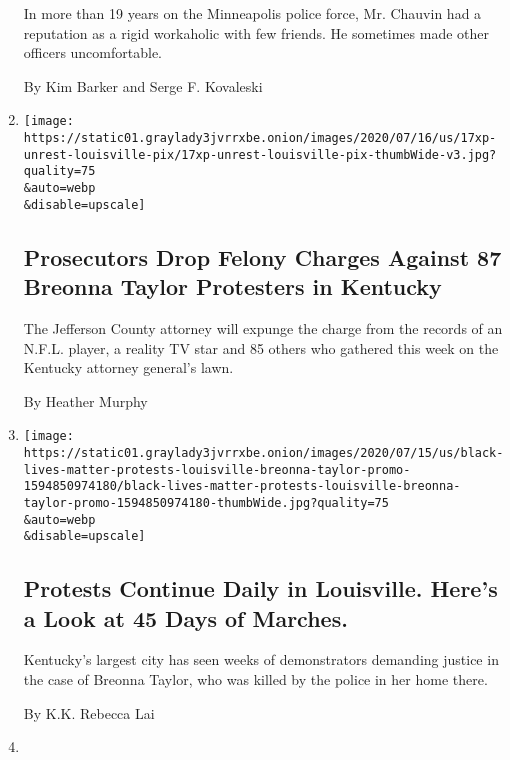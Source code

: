 \begin{enumerate}
  In more than 19 years on the Minneapolis police force, Mr. Chauvin had
  a reputation as a rigid workaholic with few friends. He sometimes made
  other officers uncomfortable.

  By Kim Barker and Serge F. Kovaleski
\item
  \href{/2020/07/17/us/breonna-taylor-louisville-protests.html}{}

  \texttt{[image: https://static01.graylady3jvrrxbe.onion/images/2020/07/16/us/17xp-unrest-louisville-pix/17xp-unrest-louisville-pix-thumbWide-v3.jpg?quality=75\\\&auto=webp\\\&disable=upscale]}

  \hypertarget{prosecutors-drop-felony-charges-against-87-breonna-taylor-protesters-in-kentucky}{%
  \subsection{Prosecutors Drop Felony Charges Against 87 Breonna Taylor
  Protesters in
  Kentucky}\label{prosecutors-drop-felony-charges-against-87-breonna-taylor-protesters-in-kentucky}}

  The Jefferson County attorney will expunge the charge from the records
  of an N.F.L. player, a reality TV star and 85 others who gathered this
  week on the Kentucky attorney general's lawn.

  By Heather Murphy
\item
  \href{/interactive/2020/07/16/us/black-lives-matter-protests-louisville-breonna-taylor.html}{}

  \texttt{[image: https://static01.graylady3jvrrxbe.onion/images/2020/07/15/us/black-lives-matter-protests-louisville-breonna-taylor-promo-1594850974180/black-lives-matter-protests-louisville-breonna-taylor-promo-1594850974180-thumbWide.jpg?quality=75\\\&auto=webp\\\&disable=upscale]}

  \hypertarget{protests-continue-daily-in-louisville-heres-a-look-at-45-days-of-marches}{%
  \subsection{Protests Continue Daily in Louisville. Here's a Look at 45
  Days of
  Marches.}\label{protests-continue-daily-in-louisville-heres-a-look-at-45-days-of-marches}}

  Kentucky's largest city has seen weeks of demonstrators demanding
  justice in the case of Breonna Taylor, who was killed by the police in
  her home there.

  By K.K. Rebecca Lai
\item
  \href{/video/us/100000007241193/george-floyd-civil-lawsuit-minneapolis.html}{}


\end{enumerate}
